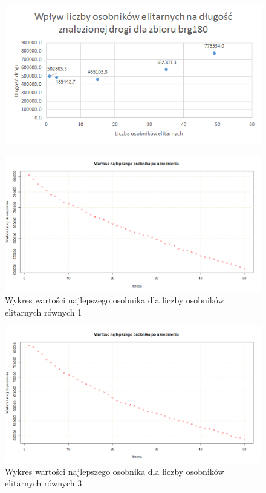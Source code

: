 \documentclass{article}
\begin{document}
\begin{figure}[H]
\centering

\includegraphics[scale=0.9]{IO_obrazy/excel_brg180_elit}
\end{figure}

\begin{figure}[H]
\centering

\includegraphics[scale=0.3]{IO_obrazy/brg180_elit_1}
\caption{Wykres wartości najlepszego osobnika dla liczby osobników elitarnych równych 1}
\end{figure}

\begin{figure}[H]
\centering

\includegraphics[scale=0.3]{IO_obrazy/brg180_elit_3}
\caption{Wykres wartości najlepszego osobnika dla liczby osobników elitarnych równych 3}
\end{figure}
\end{document}
